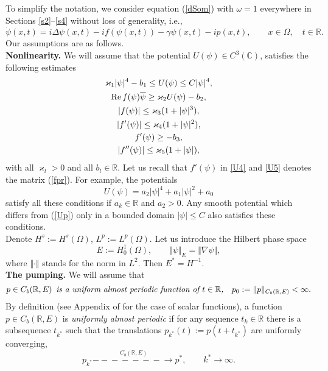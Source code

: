 \documentclass[11pt]{article}
\newcommand{\R}{{\mathbb R}}
\newcommand{\Co}{{\mathbb C}}
\newcommand{\st}{\stackrel}
\newcommand{\toCbE }{\st{C_b(\R,E)}{-\!\!\!-\!\!\!-\!\!\!-\!\!\!-\!\!\!-\!\!\!-\!\!\!\to}}
\newcommand{\om}{\omega}
\newcommand{\De}{\Delta}
\newcommand{\vka}{\varkappa}
\newcommand{\ga}{\gamma}
\newcommand{\Om}{\Omega}
\newcommand{\na}{\nabla}
\newcommand{\rRe}{{\rm Re\5}}
\newcommand{\ov}{\overline}
\newcommand{\5}{{\hspace{0.5mm}}}
\numberwithin{equation}{section}
\newcommand{\ci}{\cite}
\newcommand{\la}{\label}
\newcommand{\be}{\begin{equation}}
\newcommand{\ee}{\end{equation}}
\numberwithin{equation}{section}
\begin{document}
To simplify the notation,
we consider equation (\ref{dSom}) with $\om=1$
everywhere in Sections \ref{s2}--\ref{s4} without loss of generality, i.e.,
\be\la{dS}
\dot\psi(x,t)=i\De\psi(x,t)-if(\psi(x,t))-\ga\psi(x,t)-ip(x, t),\qquad x\in\Om,\quad t\in\R.
\ee
Our assumptions are as follows.
\smallskip\\
{\bf Nonlinearity.}
We will assume that the potential $U(\psi)\in C^3(\Co)$, satisfies the following estimates
\begin{gather}
  \vka_1|\psi|^4-b_1\le U(\psi)\le C|\psi|^4,\la{U1}
\\
\rRe f(\psi)\ov \psi\ge\vka_2 U(\psi)-b_2,\la{U2}
\\
   |f(\psi)|
\le \vka_3(1+|\psi|^3), \la{U3}
\\
  | f'(\psi)|\le \vka_4(1+|\psi|^2),\la{U4}
\\
  f'(\psi)\ge -b_3,\la{U5}
\\
  |f''(\psi)|\le \vka_5(1+|\psi|),\la{U6}
\end{gather}
with all $\vka_l>0$ and all $b_l\in\R$.
Let us recall that $f'(\psi)$ in \eqref{U4} and \eqref{U5} denotes the matrix (\ref{fpr}).
For example, the potentials
\be\la{Up}
U(\psi)=a_2|\psi|^4+a_1|\psi|^2+a_0
\ee
satisfy all these conditions if $a_k\in\R$ and $a_2>0$.
Any smooth potential which differs from (\ref{Up}) only in a bounded domain $|\psi|\le C$ also satisfies these conditions.
\smallskip\\
Denote $H^s:=H^s(\Om)$, $L^p:=L^p(\Om)$. Let us introduce the Hilbert phase space
\be\la{E0}
E:= H^1_0(\Om),\qquad \Vert \psi\Vert_{E}=\Vert\na\psi\Vert,
\ee
where $\Vert\cdot\Vert$ stands for the norm in $L^2$.
Then $E^*=H^{-1}$.
\smallskip\\
{\bf The pumping.}
We will assume that
\be\la{pT}
p\in C_b(\R,E)\,\,\,\mbox{\it is a uniform almost periodic function of $t\in\R$,}\quad
p_0:=\Vert p\Vert_{C_b(\R,E)}<\infty.
\ee
By definition (see Appendix of \ci{H1980} for the case of scalar functions), a function $p\in C_b(\R,E)$ is  {\it uniformly almost periodic} if for any sequence $t_k\in\R$ there is a subsequence $t_{k^*}$ such that
the translations $p_{k^*}(t):=p(t+t_{k^*})$ are uniformly  converging,
\be\la{alper}
p_{k^*} \toCbE p^*,\qquad k^*\to\infty.
\ee

\end{document}
